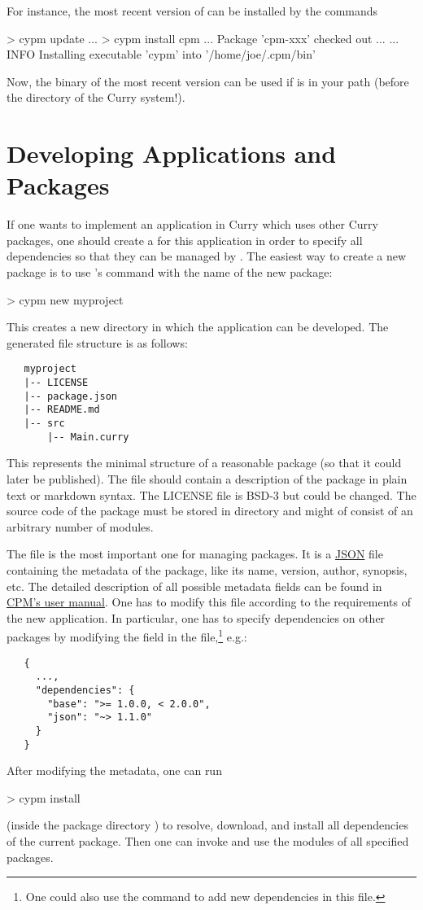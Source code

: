 For instance, the most recent version of \cpm
can be installed by the commands
%
\begin{curry}
> cypm update
...
> cypm install cpm
... Package 'cpm-xxx' checked out ...
...
INFO  Installing executable 'cypm' into '/home/joe/.cpm/bin'
\end{curry}
%
Now, the binary  of the most recent \cpm version can be used
if  is in your path
(before the  directory of the Curry system!).


\section{Developing Applications and Packages}
\label{sec:writing-packages}

If one wants to implement an application in Curry which uses
other Curry packages, one should create a  for
this application in order to specify all dependencies
so that they can be managed by \cpm.
The easiest way to create a new package is to use
\cpm's  command with the name of the new package:
%
\begin{curry}
> cypm new myproject
\end{curry}
%
This creates a new directory  in which
the application can be developed.
The generated file structure is as follows:
%
\begin{verbatim}
   myproject
   |-- LICENSE
   |-- package.json
   |-- README.md
   |-- src
       |-- Main.curry
\end{verbatim}
%
This represents the minimal structure of a reasonable package
(so that it could later be published).
The file  should contain a description
of the package in plain text or markdown syntax.
The LICENSE file is BSD-3 but could be changed.
The source code of the package must be stored
in directory  and might of consist of an arbitrary
number of modules.

The file  is the most important one
for managing packages. It is a \href{http://json.org}{JSON} file
containing the metadata of the package,
like its name, version, author, synopsis, etc.
The detailed description of all possible metadata fields
can be found in
\href{http://curry-lang.org/tools/cpm}{CPM's user manual}.
One has to modify this file according to the requirements
of the new application.
In particular, one has to specify dependencies on other packages
by modifying the field  in the
 file,\footnote{One could also use the command
 to add new dependencies in this file.}
e.g.:
%
\begin{verbatim}
   {
     ...,
     "dependencies": {
       "base": ">= 1.0.0, < 2.0.0",
       "json": "~> 1.1.0"
     }
   }
\end{verbatim}
%
After modifying the metadata, one can run
%
\begin{curry}
> cypm install
\end{curry}
%
(inside the package directory )
to resolve, download, and install all dependencies of the current package.
Then one can invoke \pakcs and use the modules of all specified
packages.

